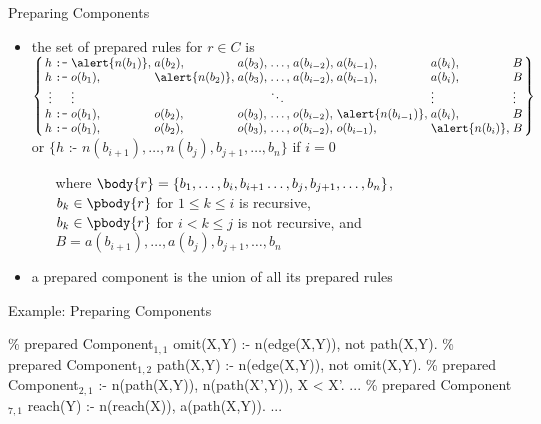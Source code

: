 \begin{frame}{Preparing Components}
  \vfill
  \begin{itemize}
    \item the set of \alert{prepared rules} for \(r \in C\) is\\
      \(\arraycolsep=1.4pt
        \left\{\begin{array}{rcllllllll}
          h & \texttt{:-} & \alert{n(b_1)}, & a(b_2),   & a(b_3), & \dots, & a(b_{i-2}), & a(b_{i-1}), & a(b_i), & B\\
          h & \texttt{:-} & o(b_1), & \alert{n(b_2)},   & a(b_3), & \dots, & a(b_{i-2}), & a(b_{i-1}), & a(b_i), & B\\
          \vdots &        & \vdots  &         &         & \ddots &             &             & \vdots  & \vdots \\
          h & \texttt{:-} & o(b_1), & o(b_2), & o(b_3), & \dots, & o(b_{i-2}), & \alert{n(b_{i-1})}, & a(b_i), & B\\
          h & \texttt{:-} & o(b_1), & o(b_2), & o(b_3), & \dots, & o(b_{i-2}), & o(b_{i-1}), & \alert{n(b_i)}, & B
        \end{array}\right\}\)\\
      or \(\{h \texttt{ :- } n(b_{i+1}), \dots, n(b_j), b_{j+1}, \dots, b_n\}\) if \(i=0\)
      \begin{itemize}
        \item[where]
          \(\body{r} = \{ b_1, \dots, b_i, b_{i+1} \dots, b_j, b_{j+1}, \dots, b_n \}\), \\
          \(b_k\in\pbody{r}\) for \(1\leq k \leq i\) is recursive, \\
          \(b_k\in\pbody{r}\) for \(i< k \leq j\) is not recursive, and \\
          \(B = a(b_{i+1}), \dots, a(b_j), b_{j+1}, \dots, b_n\)
      \end{itemize}
    \item a \alert{prepared component} is the union of all its prepared rules
  \end{itemize}
\end{frame}

\begin{frame}[fragile]{Example: Preparing Components}
  \vfill
\begin{SemiVerbatim}{.9}
{\color{comment}\% prepared Component\(_{1,1}\)}
omit(X,Y) :- \alert{n(edge(X,Y))}, not path(X,Y).
{\color{comment}\% prepared Component\(_{1,2}\)}
path(X,Y) :- \alert{n(edge(X,Y))}, not omit(X,Y).
{\color{comment}\% prepared Component\(_{2,1}\)}
:- \alert{n(path(X,Y))}, \alert{n(path(X',Y))}, X < X'.
...
{\color{comment}\% prepared Component\(_{7,1}\)}
reach(Y) :- \alert{n(reach(X))}, \alert{a(path(X,Y))}.
...
\end{SemiVerbatim}
\end{frame}

